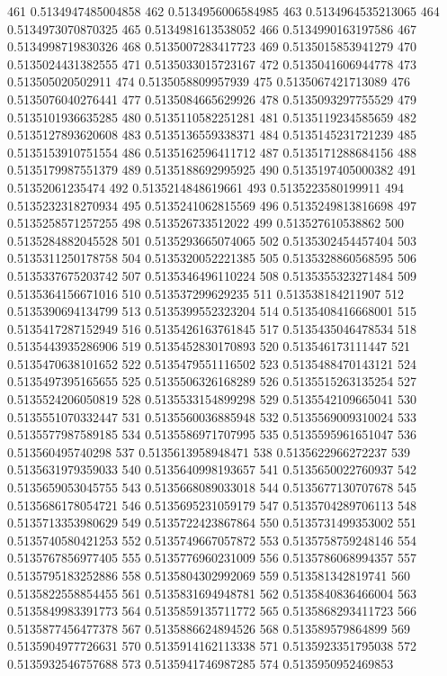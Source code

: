 461 0.5134947485004858
462 0.5134956006584985
463 0.5134964535213065
464 0.5134973070870325
465 0.5134981613538052
466 0.5134990163197586
467 0.5134998719830326
468 0.5135007283417723
469 0.5135015853941279
470 0.5135024431382555
471 0.5135033015723167
472 0.5135041606944778
473 0.513505020502911
474 0.5135058809957939
475 0.5135067421713089
476 0.5135076040276441
477 0.5135084665629926
478 0.5135093297755529
479 0.5135101936635285
480 0.5135110582251281
481 0.5135119234585659
482 0.5135127893620608
483 0.5135136559338371
484 0.5135145231721239
485 0.5135153910751554
486 0.5135162596411712
487 0.5135171288684156
488 0.5135179987551379
489 0.5135188692995925
490 0.5135197405000382
491 0.51352061235474
492 0.5135214848619661
493 0.5135223580199911
494 0.5135232318270934
495 0.5135241062815569
496 0.5135249813816698
497 0.5135258571257255
498 0.513526733512022
499 0.513527610538862
500 0.5135284882045528
501 0.5135293665074065
502 0.5135302454457404
503 0.5135311250178758
504 0.5135320052221385
505 0.5135328860568595
506 0.5135337675203742
507 0.5135346496110224
508 0.5135355323271484
509 0.5135364156671016
510 0.513537299629235
511 0.513538184211907
512 0.5135390694134799
513 0.5135399552323204
514 0.5135408416668001
515 0.5135417287152949
516 0.5135426163761845
517 0.5135435046478534
518 0.5135443935286906
519 0.5135452830170893
520 0.513546173111447
521 0.5135470638101652
522 0.5135479551116502
523 0.5135488470143121
524 0.5135497395165655
525 0.5135506326168289
526 0.5135515263135254
527 0.5135524206050819
528 0.5135533154899298
529 0.5135542109665041
530 0.5135551070332447
531 0.5135560036885948
532 0.5135569009310024
533 0.5135577987589185
534 0.5135586971707995
535 0.5135595961651047
536 0.513560495740298
537 0.5135613958948471
538 0.5135622966272237
539 0.5135631979359033
540 0.5135640998193657
541 0.5135650022760937
542 0.5135659053045755
543 0.5135668089033018
544 0.5135677130707678
545 0.5135686178054721
546 0.5135695231059179
547 0.5135704289706113
548 0.5135713353980629
549 0.5135722423867864
550 0.5135731499353002
551 0.5135740580421253
552 0.5135749667057872
553 0.5135758759248146
554 0.5135767856977405
555 0.5135776960231009
556 0.5135786068994357
557 0.5135795183252886
558 0.5135804302992069
559 0.513581342819741
560 0.5135822558854455
561 0.5135831694948781
562 0.5135840836466004
563 0.5135849983391773
564 0.5135859135711772
565 0.5135868293411723
566 0.5135877456477378
567 0.5135886624894526
568 0.513589579864899
569 0.5135904977726631
570 0.5135914162113338
571 0.5135923351795038
572 0.5135932546757688
573 0.5135941746987285
574 0.5135950952469853
